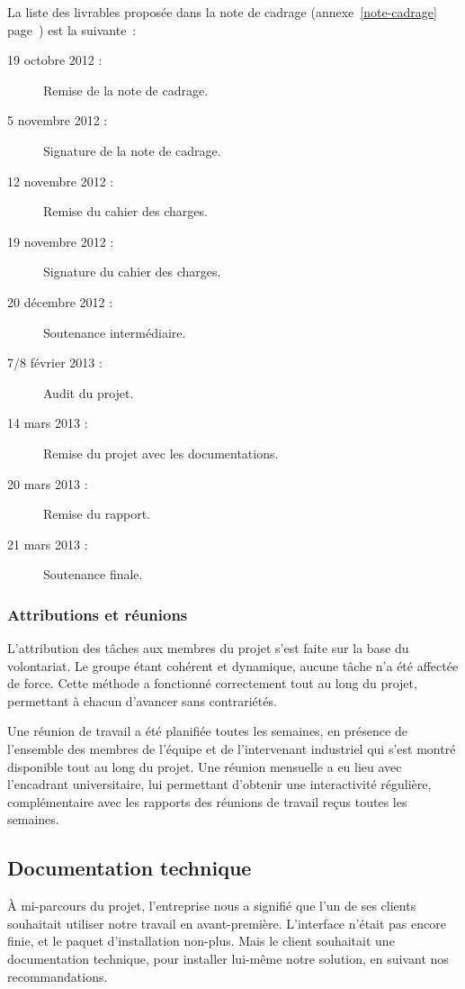 La liste des livrables proposée dans la note de cadrage (annexe~\ref{note-cadrage} page~\pageref{note-cadrage}) est la suivante~:

\begin{description}
\item[19 octobre 2012 :] Remise de la note de cadrage.
\item[5 novembre 2012 :] Signature de la note de cadrage.
\item[12 novembre 2012 :] Remise du cahier des charges.
\item[19 novembre 2012 :] Signature du cahier des charges.
\item[20 décembre 2012 :] Soutenance intermédiaire.
\item[7/8 février 2013 :] Audit du projet.
\item[14 mars 2013 :] Remise du projet avec les documentations.
\item[20 mars 2013 :] Remise du rapport.
\item[21 mars 2013 :] Soutenance finale.
\end{description}

\subsubsection{Attributions et réunions}

L'attribution des tâches aux membres du projet s'est faite sur la base du volontariat. Le groupe étant cohérent et dynamique, aucune tâche n'a été affectée de force. Cette méthode a fonctionné correctement tout au long du projet, permettant à chacun d'avancer sans contrariétés.

Une réunion de travail a été planifiée toutes les semaines, en présence de l'ensemble des membres de l'équipe et de l'intervenant industriel qui s'est montré disponible tout au long du projet. Une réunion mensuelle a eu lieu avec l'encadrant universitaire, lui permettant d'obtenir une interactivité régulière, complémentaire avec les rapports des réunions de travail reçus toutes les semaines.

\subsection{Documentation technique}

À mi-parcours du projet, l'entreprise nous a signifié que l'un de ses clients souhaitait utiliser notre travail en avant-première. L'interface n'était pas encore finie, et le paquet d'installation non-plus. Mais le client souhaitait une documentation technique, pour installer lui-même notre solution, en suivant nos recommandations.

